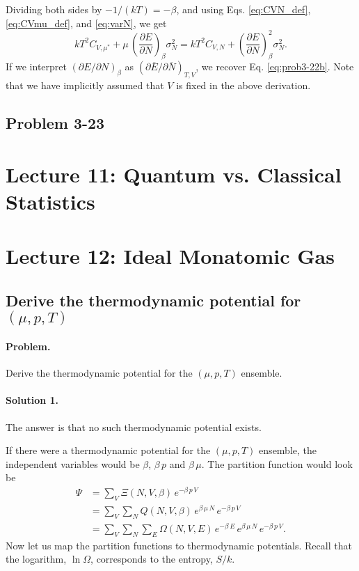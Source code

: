 \documentclass[reprint]{revtex4-1}
\numberwithin{equation}{section}
\begin{document}
%
Dividing both sides by $-1/(k T) = -\beta$,
and using Eqs. \eqref{eq:CVN_def}, \eqref{eq:CVmu_def}, and \eqref{eq:varN},
we get
$$
  k T^2 C_{V, \mu^*}
  +
  \mu \,
  \left( \frac{ \partial E } {\partial N } \right)_{\beta}
  \sigma_N^2
  =
  k T^2 C_{V, N}
  +
  \left( \frac{ \partial E } {\partial N } \right)_{\beta}^2
  \sigma_N^2
  .
$$
If we interpret
$\left( \partial E / \partial N \right)_{\beta}$
as
$\left( \partial \overline E / \partial \overline N \right)_{T, V}$,
we recover Eq. \eqref{eq:prob3-22b}.
Note that we have implicitly assumed that $V$ is fixed in the above derivation.


\subsection{Problem 3-23}

\section{Lecture 11: Quantum vs. Classical Statistics}

\section{Lecture 12: Ideal Monatomic Gas}

\subsection{Derive the thermodynamic potential for $(\mu, p, T)$}

\paragraph*{Problem.}

Derive the thermodynamic potential for the $(\mu, p, T)$ ensemble.


\paragraph*{Solution 1.}

The answer is that no such thermodynamic potential exists.

If there were a thermodynamic potential for the $(\mu, p, T)$ ensemble,
the independent variables would be $\beta$, $\beta \, p$ and $\beta \, \mu$.
%
The partition function would look be
\begin{align*}
  \Psi
  &=
  \sum_V \Xi(N, V, \beta) \, e^{-\beta \, p \, V}
  \\
  &=
  \sum_V \sum_N Q(N, V, \beta) \, e^{\beta \, \mu \, N} \, e^{-\beta \, p \, V}
  \\
  &=
  \sum_V \sum_N \sum_E \Omega(N, V, E) \, e^{-\beta \, E}
  \, e^{\beta \, \mu \, N} \, e^{-\beta \, p \, V}
  .
\end{align*}
%
Now let us map the partition functions to thermodynamic potentials.
%
Recall that the logarithm, $\ln \Omega$,
corresponds to the entropy, $S/k$.
\end{document}
